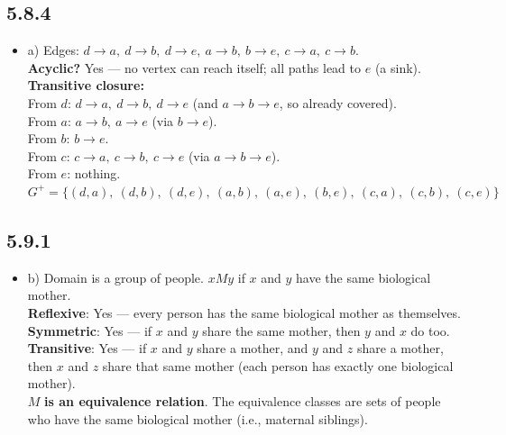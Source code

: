 \documentclass{article}
\begin{document}
\subsection*{5.8.4}
\begin{itemize}
    \item a) Edges: $d \to a,\ d \to b,\ d \to e,\ a \to b,\ b \to e,\ c \to a,\ c \to b$.\\
    \textbf{Acyclic?} Yes --- no vertex can reach itself; all paths lead to $e$ (a sink).\\[4pt]
    \textbf{Transitive closure:}\\
    From $d$: $d \to a,\ d \to b,\ d \to e$ (and $a \to b \to e$, so already covered).\\
    From $a$: $a \to b,\ a \to e$ (via $b \to e$).\\
    From $b$: $b \to e$.\\
    From $c$: $c \to a,\ c \to b,\ c \to e$ (via $a \to b \to e$).\\
    From $e$: nothing.\\[4pt]
    $G^+ = \{(d,a),\ (d,b),\ (d,e),\ (a,b),\ (a,e),\ (b,e),\ (c,a),\ (c,b),\ (c,e)\}$
\end{itemize}

\subsection*{5.9.1}
\begin{itemize}
    \item b) Domain is a group of people. $xMy$ if $x$ and $y$ have the same biological mother.\\
    \textbf{Reflexive}: Yes --- every person has the same biological mother as themselves.\\
    \textbf{Symmetric}: Yes --- if $x$ and $y$ share the same mother, then $y$ and $x$ do too.\\
    \textbf{Transitive}: Yes --- if $x$ and $y$ share a mother, and $y$ and $z$ share a mother, then $x$ and $z$ share that same mother (each person has exactly one biological mother).\\[4pt]
    $M$ \textbf{is an equivalence relation}. The equivalence classes are sets of people who have the same biological mother (i.e., maternal siblings).
\end{itemize}
\end{document}
